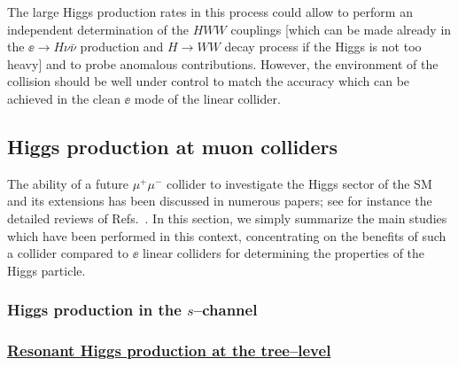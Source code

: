 The large Higgs production rates in this process could allow to perform
an independent determination of the $HWW$ couplings [which can be made already
in the  $\ee \to H \nu \bar{\nu}$ production and $H \to WW$ decay process if
the Higgs is not too heavy] and to probe anomalous contributions.
However, the environment of the collision should be well under control to match
the accuracy which can be achieved in the clean $\ee$  mode of the linear
collider. 

\subsection{Higgs production at muon colliders}

The ability of a future $\mu^+ \mu^-$ collider to investigate the Higgs sector
of the SM and its  extensions has been discussed in numerous papers; see for
instance the detailed reviews of
Refs.~\cite{mu-machine1,mu-machine2,mu-Rev1,mu-Rev2,mu-Rev3,mu-Rev4}.  In this
section, we simply summarize the main studies which have been performed
in this context, concentrating on the benefits of such a collider compared to
$\ee$ linear colliders for determining the properties of the Higgs particle.  

\subsubsection{Higgs production in the $s$--channel}

\subsubsection*{\underline{Resonant Higgs production at the tree--level}} 

